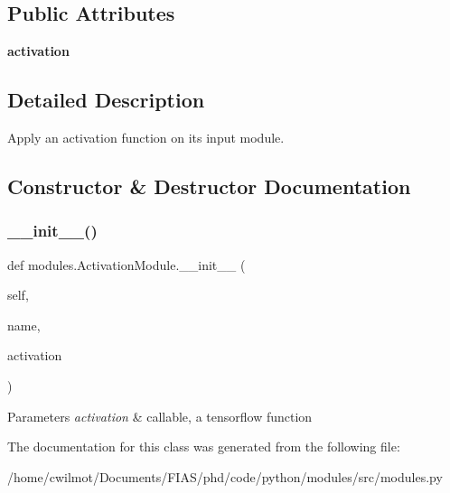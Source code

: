 \subsection*{Public Attributes}
\begin{DoxyCompactItemize}
\item 
\mbox{\label{classmodules_1_1_activation_module_acc7b47491ec7f994594f9e0d2996f61e}} 
{\bfseries activation}
\end{DoxyCompactItemize}


\subsection{Detailed Description}
Apply an activation function on its input module. 

\subsection{Constructor \& Destructor Documentation}
\mbox{\label{classmodules_1_1_activation_module_a8de2b8f05ce37f9d874b4a9872dc0b5e}} 
\subsubsection{\texorpdfstring{\+\_\+\+\_\+init\+\_\+\+\_\+()}{\_\_init\_\_()}}
{\footnotesize\ttfamily def modules.\+Activation\+Module.\+\_\+\+\_\+init\+\_\+\+\_\+ (\begin{DoxyParamCaption}\item[{}]{self,  }\item[{}]{name,  }\item[{}]{activation }\end{DoxyParamCaption})}


\begin{DoxyParams}{Parameters}
{\em activation} & callable, a tensorflow function \\
\hline
\end{DoxyParams}


The documentation for this class was generated from the following file\+:\begin{DoxyCompactItemize}
\item 
/home/cwilmot/\+Documents/\+F\+I\+A\+S/phd/code/python/modules/src/modules.\+py\end{DoxyCompactItemize}
